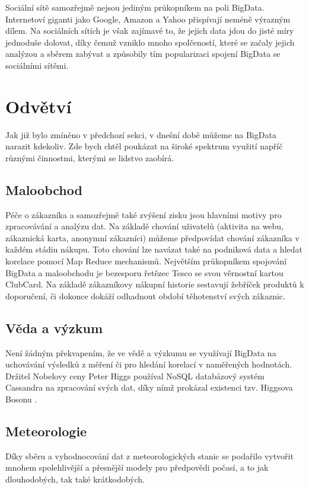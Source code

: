 Sociální sítě samozřejmě nejsou jediným průkopníkem na poli BigData. Internetoví giganti jako Google, Amazon a Yahoo přispívají neméně výrazným dílem. Na sociálních sítích je však zajímavé to, že jejich data jdou do jisté míry jednoduše dolovat, díky čemuž vzniklo mnoho spolčeností, které se začaly jejich analýzou a sběrem zabývat a způsobily tím popularizaci spojení BigData se sociálními sítěmi. 


\section{Odvětví}

Jak již bylo zmíněno v předchozí sekci, v dnešní době můžeme na BigData narazit kdekoliv. Zde bych chtěl poukázat na široké spektrum využití napříč různými činnostmi, kterými se lidstvo zaobírá.\cite{sektory}

\subsection{Maloobchod}
Péče o zákazníka a samozřejmě také zvýšení zisku jsou hlavními motivy pro zpracovávání a analýzu dat. Na základě chování uživatelů (aktivita na webu, zákaznická karta, anonymní zákazníci) můžeme předpovídat chování zákazníka v každém stádiu nákupu. Toto chování lze navázat také na podniková data a hledat korelace pomocí Map Reduce mechanismů. Největším průkopníkem spojování BigData a maloobchodu je bezesporu řetězec Tesco se svou věrnostní kartou ClubCard. Na základě zákazníkovy nákupní historie sestavují žebříček produktů k doporučení, či dokonce dokáží odhadnout období těhotenství svých zákaznic.\cite{tesco}

\subsection{Věda a výzkum}

Není žádným překvapením, že ve vědě a výzkumu se využívají BigData na uchovávání výsledků z měření či pro hledání korelací v naměřených hodnotách. Držitel Nobelovy ceny Peter Higgs používal NoSQL databázový systém Cassandra na zpracování svých dat, díky nímž prokázal existenci tzv. Higgsova Bosonu \cite{higgs}.

\subsection{Meteorologie}
Díky sběru a vyhodnocování dat z meteorologických stanic se podařilo vytvořit mnohem spolehlivější a přesnější modely pro předpovědi počasí, a to jak dlouhodobých, tak také krátkodobých. 

